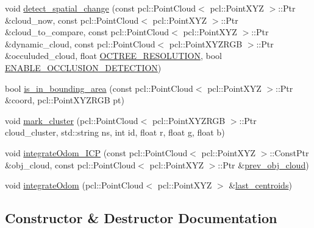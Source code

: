 \begin{DoxyCompactItemize}
\item 
void \hyperlink{classdatmo_1_1cloud__segmentation_a6dcd90f46e590756a42aafd290443fcf}{detect\+\_\+spatial\+\_\+change} (const pcl\+::\+Point\+Cloud$<$ pcl\+::\+Point\+X\+YZ $>$\+::Ptr \&cloud\+\_\+now, const pcl\+::\+Point\+Cloud$<$ pcl\+::\+Point\+X\+YZ $>$\+::Ptr \&cloud\+\_\+to\+\_\+compare, const pcl\+::\+Point\+Cloud$<$ pcl\+::\+Point\+X\+YZ $>$\+::Ptr \&dynamic\+\_\+cloud, const pcl\+::\+Point\+Cloud$<$ pcl\+::\+Point\+X\+Y\+Z\+R\+GB $>$\+::Ptr \&occuluded\+\_\+cloud, float \hyperlink{classdatmo_1_1cloud__segmentation_aba086f9f8e05f18c02c042c057854a06}{O\+C\+T\+R\+E\+E\+\_\+\+R\+E\+S\+O\+L\+U\+T\+I\+ON}, bool \hyperlink{classdatmo_1_1cloud__segmentation_a5f7ffa75c60af605cc914de7296cddb1}{E\+N\+A\+B\+L\+E\+\_\+\+O\+C\+C\+L\+U\+S\+I\+O\+N\+\_\+\+D\+E\+T\+E\+C\+T\+I\+ON})
\item 
bool \hyperlink{classdatmo_1_1cloud__segmentation_a5bcf85ac924671c64840ac2087877a5f}{is\+\_\+in\+\_\+bounding\+\_\+area} (const pcl\+::\+Point\+Cloud$<$ pcl\+::\+Point\+X\+YZ $>$\+::Ptr \&coord, pcl\+::\+Point\+X\+Y\+Z\+R\+GB pt)
\item 
void \hyperlink{classdatmo_1_1cloud__segmentation_a77ecff192bbc43fd3182acb675d43350}{mark\+\_\+cluster} (pcl\+::\+Point\+Cloud$<$ pcl\+::\+Point\+X\+Y\+Z\+R\+GB $>$\+::Ptr cloud\+\_\+cluster, std\+::string ns, int id, float r, float g, float b)
\item 
void \hyperlink{classdatmo_1_1cloud__segmentation_a44ccd6481ff32f6325121df0873a5d0d}{integrate\+Odom\+\_\+\+I\+CP} (const pcl\+::\+Point\+Cloud$<$ pcl\+::\+Point\+X\+YZ $>$\+::Const\+Ptr \&obj\+\_\+cloud, const pcl\+::\+Point\+Cloud$<$ pcl\+::\+Point\+X\+YZ $>$\+::Ptr \&\hyperlink{classdatmo_1_1cloud__segmentation_aa1ea3bcb86aff4916200ff899a4198c4}{prev\+\_\+obj\+\_\+cloud})
\item 
void \hyperlink{classdatmo_1_1cloud__segmentation_a40bcbb38bad5059c86e845e84ac113d0}{integrate\+Odom} (pcl\+::\+Point\+Cloud$<$ pcl\+::\+Point\+X\+YZ $>$ \&\hyperlink{classdatmo_1_1cloud__segmentation_a576b87bb01fef0d14ba862f08ca8e2ba}{last\+\_\+centroids})
\end{DoxyCompactItemize}


\subsection{Constructor \& Destructor Documentation}
\mbox{\label{classdatmo_1_1cloud__segmentation_a7624176c1ff33d2fa3930bf9eef89c19}} 
